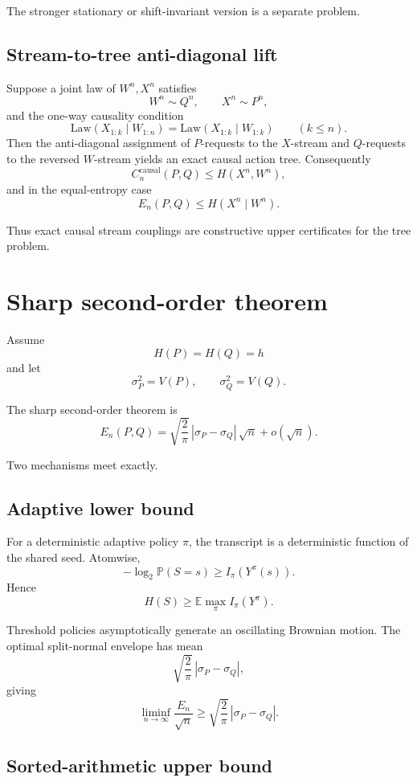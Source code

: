 \documentclass[11pt,a4paper]{article}
\newcommand{\E}{\mathbb E}
\newcommand{\PP}{\mathbb P}
\newcommand{\Law}{\mathrm{Law}}
\begin{document}
The stronger stationary or shift-invariant version is a separate problem.

\subsection{Stream-to-tree anti-diagonal lift}

Suppose a joint law of \(W^n,X^n\) satisfies
\[
W^n\sim Q^n,
\qquad
X^n\sim P^n,
\]
and the one-way causality condition
\[
\Law(X_{1:k}\mid W_{1:n})
=
\Law(X_{1:k}\mid W_{1:k})
\qquad
(k\le n).
\]
Then the anti-diagonal assignment of \(P\)-requests to the \(X\)-stream and
\(Q\)-requests to the reversed \(W\)-stream yields an exact causal action
tree.  Consequently
\[
C_n^{\mathrm{causal}}(P,Q)
\le
H(X^n,W^n),
\]
and in the equal-entropy case
\[
\boxed{
E_n(P,Q)
\le
H(X^n\mid W^n).
}
\]

Thus exact causal stream couplings are constructive upper certificates for
the tree problem.

\section{Sharp second-order theorem}

Assume
\[
H(P)=H(Q)=h
\]
and let
\[
\sigma_P^2=V(P),
\qquad
\sigma_Q^2=V(Q).
\]

The sharp second-order theorem is
\[
\boxed{
E_n(P,Q)
=
\sqrt{\frac{2}{\pi}}\,
|\sigma_P-\sigma_Q|\,\sqrt n
+
o(\sqrt n).
}
\]

Two mechanisms meet exactly.

\subsection{Adaptive lower bound}

For a deterministic adaptive policy \(\pi\), the transcript is a deterministic
function of the shared seed.  Atomwise,
\[
-\log_2 \PP(S=s)
\ge
I_\pi(Y^\pi(s)).
\]
Hence
\[
H(S)
\ge
\E\max_\pi I_\pi(Y^\pi).
\]

Threshold policies asymptotically generate an oscillating Brownian motion.
The optimal split-normal envelope has mean
\[
\sqrt{\frac{2}{\pi}}\,
|\sigma_P-\sigma_Q|,
\]
giving
\[
\liminf_{n\to\infty}
\frac{E_n}{\sqrt n}
\ge
\sqrt{\frac{2}{\pi}}\,
|\sigma_P-\sigma_Q|.
\]

\subsection{Sorted-arithmetic upper bound}
\end{document}

